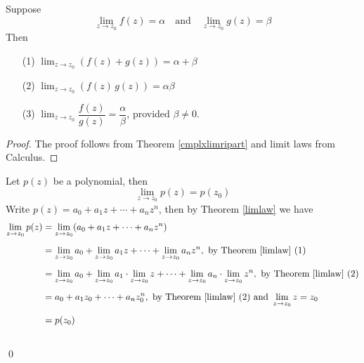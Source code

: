 \medskip

\begin{theorem}\label{limlaw}
Suppose
\[\lim_{z \to z_0} f(z) = \alpha \quad \text{and} \quad \lim_{z \to z_0} g(z) = \beta\]
Then
\begin{itemize}
\item[(1)] $\lim_{z \to z_0} (f(z) + g(z)) = \alpha + \beta$
\item[(2)] $\lim_{z \to z_0} (f(z)\,g(z)) = \alpha\beta$
\item[(3)] $\lim_{z \to z_0} \dfrac{f(z)}{g(z)} = \dfrac{\alpha}{\beta}$, provided $\beta \neq 0$.
\end{itemize}
\end{theorem}
\begin{proof}
The proof follows from Theorem \ref{cmplxlimripart} and limit laws from Calculus.
\end{proof}

\medskip

\begin{example}\label{polycts}
Let $p(z)$ be a polynomial, then
\[\lim_{z \to z_0}p(z) = p(z_0)\]
Write $p(z) = a_0 + a_1z + \cdots + a_nz^n$, then by Theorem \ref{limlaw} we have
\begin{align*}
\lim_{z \to z_0}p(z) &= \lim_{z \to z_0}(a_0 + a_1z + \cdots + a_nz^n)\\[0.5em]
&= \lim_{z \to z_0} a_0 + \lim_{z \to z_0} a_1z + \cdots + \lim_{z \to z_0} a_nz^n,\ \text{by Theorem \ref{limlaw} (1)}\\[0.5em]
&= \lim_{z \to z_0} a_0 + \lim_{z \to z_0} a_1 \cdot \lim_{z \to z_0} z + \cdots + \lim_{z \to z_0} a_n \cdot \lim_{z \to z_0} z^n,\ \text{by Theorem \ref{limlaw} (2)}\\[0.5em]
&= a_0 + a_1z_0 + \cdots + a_nz_0^n,\ \text{by Theorem \ref{limlaw} (2) and }\lim_{z \to z_0} z = z_0\\[0.5em]
&= p(z_0)
\end{align*}\\[-2em]
\qed
\end{example}

\bigskip

